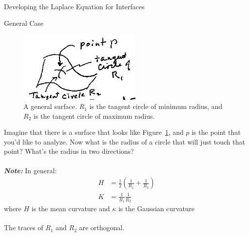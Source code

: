 \documentclass{article}
\newcommand{\note}[1]{\\\\\textbf{\textit{Note: }}#1\\\\}
\begin{document}
\begin{section}{Developing the Laplace Equation for Interfaces}
\begin{subsection}{General Case}
	\begin{figure}[h]
		\centering
		\includegraphics[height=100pt]{tangentCircle}
		\caption{A general surface. $R_1$ is the tangent circle of minimum radius, and $R_2$ is the tangent circle of maximum radius.}
		\label{fig:General Surface}
	\end{figure}
	Imagine that there is a surface that looks like Figure~\ref{fig:General Surface}, and $p$ is the point that you'd like to analyze. Now what is the radius of a circle that will just touch that point? What's the radius in two directions?
	\note{In general:
	\begin{align*}
		H &= \frac{1}{2} \left(\frac{1}{R_1} + \frac{1}{R_2}\right)\\
		K &= \frac{1}{R_1}\frac{1}{R_2}
	\end{align*}
where $H$ is the mean curvature and $\kappa$ is the Gaussian curvature}

	The traces of $R_1$ and $R_2$ are orthogonal. 
\end{subsection}
\end{section}
\end{document}
